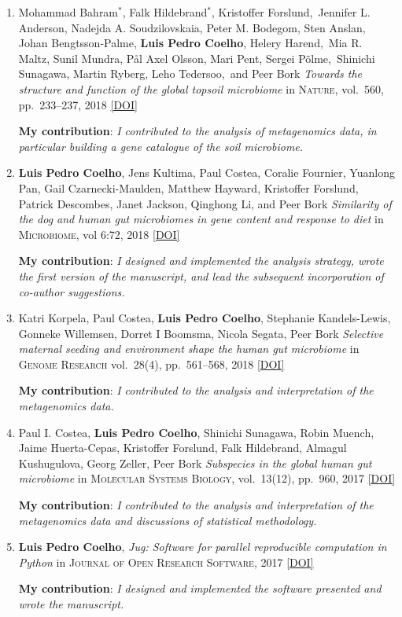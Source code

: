 \documentclass{article}
\newcommand\showdoi[1]{%
    \href{http://dx.doi.org/#1}{[DOI]}%
}
\newcommand\pubname[1]{\textsc{#1}}
\newcommand\contribution[1]{\relax\hfill\break\textbf{My contribution}: \textit{#1}}
\newcommand\costar{${}^{*}$}
\begin{document}
\begin{enumerate}[resume]
\item Mohammad Bahram\costar, Falk Hildebrand\costar, Kristoffer
Forslund, Jennifer L. Anderson, Nadejda A. Soudzilovskaia, Peter M. Bodegom,
Sten Anslan, Johan Bengtsson-Palme, \textbf{Luis Pedro Coelho}, Helery
Harend, Mia R. Maltz, Sunil Mundra, Pål Axel Olsson, Mari Pent, Sergei
Põlme, Shinichi Sunagawa, Martin Ryberg, Leho Tedersoo, and Peer Bork
\emph{Towards the structure and function of the global topsoil microbiome} in
\pubname{Nature}, vol.\ 560, pp.\ 233--237, 2018
\showdoi{10.1038/s41586-018-0386-6}
\contribution{I contributed to the analysis of metagenomics data, in particular
building a gene catalogue of the soil microbiome.}


\item \textbf{Luis Pedro Coelho}, Jens Kultima, Paul Costea, Coralie Fournier,
Yuanlong Pan, Gail Czarnecki-Maulden, Matthew Hayward, Kristoffer Forslund,
Patrick Descombes, Janet Jackson, Qinghong Li, and Peer Bork \emph{Similarity
of the dog and human gut microbiomes in gene content and response to diet} in
\pubname{Microbiome}, vol 6:72, 2018 \showdoi{10.1186/s40168-018-0450-3}
\contribution{I designed and implemented the analysis strategy, wrote the first
version of the manuscript, and lead the subsequent incorporation of co-author
suggestions.}

\item Katri Korpela, Paul Costea, \textbf{Luis Pedro Coelho}, Stephanie
Kandels-Lewis, Gonneke Willemsen, Dorret I Boomsma, Nicola Segata, Peer Bork
\emph{Selective maternal seeding and environment shape the human gut
microbiome} in \pubname{Genome Research} vol.\ 28(4), pp.\ 561--568, 2018
\showdoi{10.1101/gr.233940.117}
\contribution{I contributed to the analysis and interpretation of the
metagenomics data.}

\item Paul I. Costea, \textbf{Luis Pedro Coelho}, Shinichi Sunagawa, Robin
Muench, Jaime Huerta-Cepas, Kristoffer Forslund, Falk Hildebrand, Almagul
Kushugulova, Georg Zeller, Peer Bork \emph{Subspecies in the global human gut
microbiome} in \pubname{Molecular Systems Biology}, vol.\ 13(12), pp.\ 960,
2017 \showdoi{10.15252/msb.20177589}
\contribution{I contributed to the analysis and interpretation of the
metagenomics data and discussions of statistical methodology.}

\item \textbf{Luis Pedro Coelho}, \emph{Jug: Software for parallel reproducible
computation in Python} in \pubname{Journal of Open Research
Software}, 2017 \showdoi{10.5334/jors.161}
\contribution{I designed and implemented the software presented and wrote the
manuscript.}


\end{enumerate}
\end{document}
